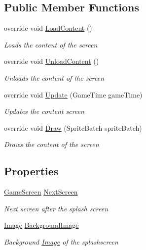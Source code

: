 \subsection*{Public Member Functions}
\begin{DoxyCompactItemize}
\item 
override void \hyperlink{class_hel_project_1_1_u_i_1_1_splash_screen_a5a20d77a817cf6982efb89576d5e32d0}{Load\+Content} ()
\begin{DoxyCompactList}\small\item\em Loads the content of the screen \end{DoxyCompactList}\item 
override void \hyperlink{class_hel_project_1_1_u_i_1_1_splash_screen_ad00f04421eabaf7b516eddc371350ef2}{Unload\+Content} ()
\begin{DoxyCompactList}\small\item\em Unloads the content of the screen \end{DoxyCompactList}\item 
override void \hyperlink{class_hel_project_1_1_u_i_1_1_splash_screen_abf282bea4e6f1ee8a6ab03f812f130d3}{Update} (Game\+Time game\+Time)
\begin{DoxyCompactList}\small\item\em Updates the content screen \end{DoxyCompactList}\item 
override void \hyperlink{class_hel_project_1_1_u_i_1_1_splash_screen_a5c978af3192a5de1f344e8b16821a2d8}{Draw} (Sprite\+Batch sprite\+Batch)
\begin{DoxyCompactList}\small\item\em Draws the content of the screen \end{DoxyCompactList}\end{DoxyCompactItemize}
\subsection*{Properties}
\begin{DoxyCompactItemize}
\item 
\hyperlink{class_hel_project_1_1_u_i_1_1_game_screen}{Game\+Screen} \hyperlink{class_hel_project_1_1_u_i_1_1_splash_screen_abcc41435703b36b419b18600a05a42f5}{Next\+Screen}
\begin{DoxyCompactList}\small\item\em Next screen after the splash screen \end{DoxyCompactList}\item 
\hyperlink{class_hel_project_1_1_u_i_1_1_image}{Image} \hyperlink{class_hel_project_1_1_u_i_1_1_splash_screen_adb2597647fe28bc0a62aec62c5a4e435}{Background\+Image}
\begin{DoxyCompactList}\small\item\em Background \hyperlink{class_hel_project_1_1_u_i_1_1_image}{Image} of the splashscreen \end{DoxyCompactList}\end{DoxyCompactItemize}


